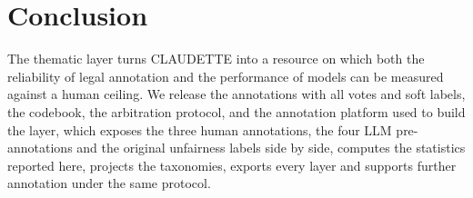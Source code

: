 \documentclass{IOS-Book-Article}
\newcommand{\corpus}{CLAUDETTE}
\begin{document}
\section{Conclusion}
\label{sec:conclusion}
The thematic layer turns \corpus{} into a resource on which both the reliability of legal annotation and the performance of models can be measured against a human ceiling. We release the annotations with all votes and soft labels, the codebook, the arbitration protocol, and the annotation platform used to build the layer, which exposes the three human annotations, the four LLM pre-annotations and the original unfairness labels side by side, computes the statistics reported here, projects the taxonomies, exports every layer and supports further annotation under the same protocol.



\end{document}
